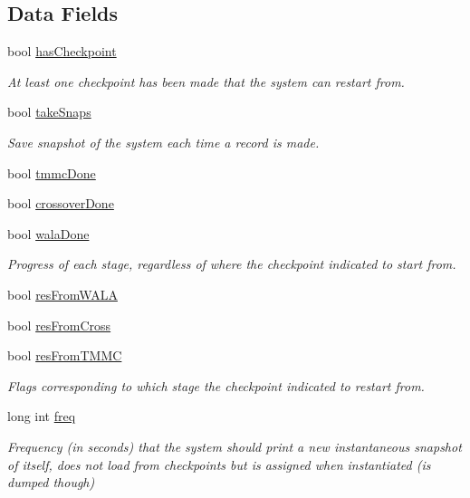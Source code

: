 \subsection*{Data Fields}
\begin{DoxyCompactItemize}
\item 
bool \hyperlink{classcheckpoint_aa75f306fcb0c2360d948fa3a61adfed5}{has\-Checkpoint}
\begin{DoxyCompactList}\small\item\em At least one checkpoint has been made that the system can restart from. \end{DoxyCompactList}\item 
bool \hyperlink{classcheckpoint_a685226e8bae8084937f73f65c326c362}{take\-Snaps}
\begin{DoxyCompactList}\small\item\em Save snapshot of the system each time a record is made. \end{DoxyCompactList}\item 
bool \hyperlink{classcheckpoint_acbe0c62aa82735741a9f396827966823}{tmmc\-Done}
\item 
bool \hyperlink{classcheckpoint_a4f13612ea6d376bb327295bfce3a70c5}{crossover\-Done}
\item 
bool \hyperlink{classcheckpoint_aab066479e2ca6656d0031dd46a2fc1a5}{wala\-Done}
\begin{DoxyCompactList}\small\item\em Progress of each stage, regardless of where the checkpoint indicated to start from. \end{DoxyCompactList}\item 
bool \hyperlink{classcheckpoint_a46f1c17d03901292f642ccad0a325d9e}{res\-From\-W\-A\-L\-A}
\item 
bool \hyperlink{classcheckpoint_ac3e65d26f2b8231ae9dd7e29c72ecf3b}{res\-From\-Cross}
\item 
bool \hyperlink{classcheckpoint_ab8f6081561b8c7871eea6743d4988d8a}{res\-From\-T\-M\-M\-C}
\begin{DoxyCompactList}\small\item\em Flags corresponding to which stage the checkpoint indicated to restart from. \end{DoxyCompactList}\item 
long int \hyperlink{classcheckpoint_a11a2d78eb0bf6045b659a4d18b53da44}{freq}
\begin{DoxyCompactList}\small\item\em Frequency (in seconds) that the system should print a new instantaneous snapshot of itself, does not load from checkpoints but is assigned when instantiated (is dumped though) \end{DoxyCompactList}\item 

\end{DoxyCompactItemize}

